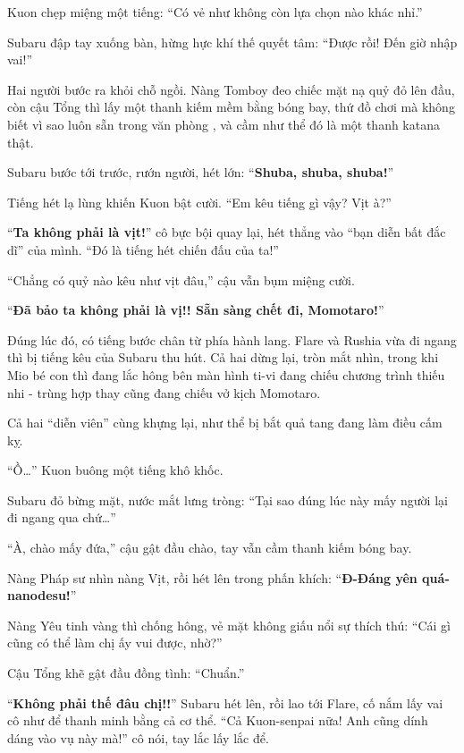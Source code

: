 \documentclass[../main.tex]{subfiles}
\begin{document}

Kuon chẹp miệng một tiếng: ``Có vẻ như không còn lựa chọn nào khác nhỉ.''

Subaru đập tay xuống bàn, hừng hực khí thế quyết tâm: ``Được rồi! Đến giờ nhập vai!''

Hai người bước ra khỏi chỗ ngồi. Nàng Tomboy đeo chiếc mặt nạ quỷ đỏ lên đầu, còn cậu Tổng thì lấy một thanh kiếm mềm bằng bóng bay, thứ đồ chơi mà không biết vì sao luôn sẵn trong văn phòng \hll, và cầm như thể đó là một thanh katana thật.

Subaru bước tới trước, rướn người, hét lớn: ``\textbf{Shuba, shuba, shuba!}''

Tiếng hét lạ lùng khiến Kuon bật cười. ``Em kêu tiếng gì vậy? Vịt à?''

``\textbf{Ta không phải là vịt!}'' cô bực bội  quay lại, hét thẳng vào ``bạn diễn bất đắc dĩ'' của mình. ``Đó là tiếng hét chiến đấu của ta!''

``Chẳng có quỷ nào kêu như vịt đâu,'' cậu vẫn bụm miệng cười.

``\textbf{Đã bảo ta không phải là vị!! Sẵn sàng chết đi, Momotaro!}''

Đúng lúc đó, có tiếng bước chân từ phía hành lang. Flare và Rushia vừa đi ngang thì bị tiếng kêu của Subaru thu hút. Cả hai dừng lại, tròn mắt nhìn, trong khi Mio bé con thì đang lắc hông bên màn hình ti-vi đang chiếu chương trình thiếu nhi - trùng hợp thay cũng đang chiếu vở kịch Momotaro.


Cả hai ``diễn viên'' cùng khựng lại, như thể bị bắt quả tang đang làm điều cấm kỵ.

``Ồ\dots'' Kuon buông một tiếng khô khốc.

Subaru đỏ bừng mặt, nước mắt lưng tròng: ``Tại sao đúng lúc này mấy người lại đi ngang qua chứ\dots''

``À, chào mấy đứa,'' cậu gật đầu chào, tay vẫn cầm thanh kiếm bóng bay.

Nàng Pháp sư nhìn nàng Vịt, rồi hét lên trong phấn khích: ``\textbf{Đ-Đáng yên quá-nanodesu!}''

Nàng Yêu tinh vàng thì chống hông, vẻ mặt không giấu nổi sự thích thú: ``Cái gì cũng có thể làm chị ấy vui được, nhờ?''

Cậu Tổng khẽ gật đầu đồng tình: ``Chuẩn.''

``\textbf{Không phải thế đâu chị!!}'' Subaru hét lên, rồi lao tới Flare, cố nắm lấy vai cô như để thanh minh bằng cả cơ thể. ``Cả Kuon-senpai nữa! Anh cũng dính dáng vào vụ này mà!'' cô nói, tay lắc lấy lắc để.
\end{document}
